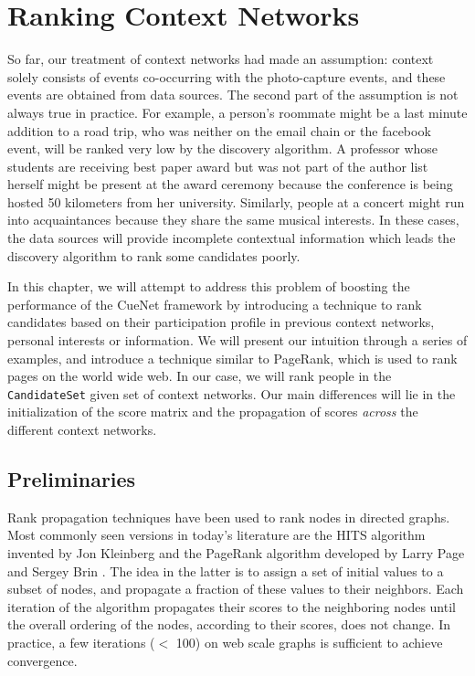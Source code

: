 \chapter{Ranking Context Networks}

So far, our treatment of context networks had made an assumption: context solely consists of events co-occurring with the photo-capture events, and these events are obtained from data sources. The second part of the assumption is not always true in practice. For example, a person's roommate might be a last minute addition to a road trip, who was neither on the email chain or the facebook event, will be ranked very low by the discovery algorithm. A professor whose students are receiving best paper award but was not part of the author list herself might be present at the award ceremony because the conference is being hosted 50 kilometers from her university. Similarly, people at a concert might run into acquaintances because they share the same musical interests. In these cases, the data sources will provide incomplete contextual information which leads the discovery algorithm to rank some candidates poorly.

In this chapter, we will attempt to address this problem of boosting the performance of the CueNet framework by introducing a technique to rank candidates based on their participation profile in previous context networks, personal interests or information. We will present our intuition through a series of examples, and introduce a technique similar to PageRank, which is used to rank pages on the world wide web. In our case, we will rank people in the \texttt{CandidateSet} given set of context networks. Our main differences will lie in the initialization of the score matrix and the propagation of scores \textit{across} the different context networks.

\section{Preliminaries}

Rank propagation techniques have been used to rank nodes in directed graphs. Most commonly seen versions in today's literature are the HITS algorithm invented by Jon Kleinberg \cite{kleinberg1999authoritative} and the PageRank algorithm developed by Larry Page and Sergey Brin \cite{page1999pagerank}. The idea in the latter is to assign a set of initial values to a subset of nodes, and propagate a fraction of these values to their neighbors. Each iteration of the algorithm propagates their scores to the neighboring nodes until the overall ordering of the nodes, according to their scores, does not change. In practice, a few iterations ($<$ 100) on web scale graphs is sufficient to achieve convergence.


